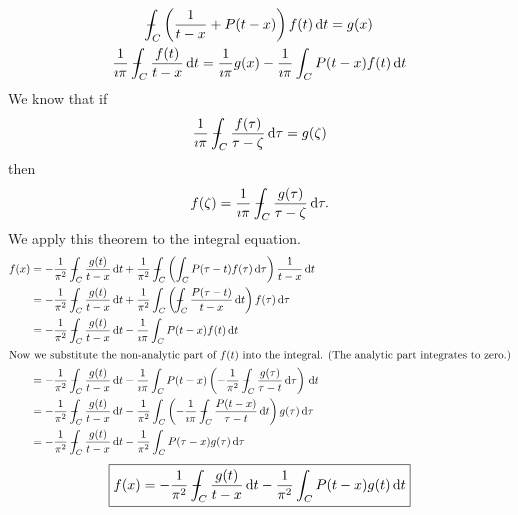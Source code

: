 \begin{Solution}
  \begin{gather*}
    \pv\int_C \left( \frac{1}{t-x} + P(t-x) \right) f(t) \,\dd t = g(x) \\
    \frac{1}{\imath \pi} \pv\int_C \frac{f(t)}{t-x} \,\dd t = \frac{1}{\imath \pi} g(x) 
    - \frac{1}{\imath \pi} \int_C P(t-x) f(t) \,\dd t 
  \end{gather*}
  We know that if 
  \[
  \frac{1}{\imath \pi} - \negthickspace \negthickspace \negthickspace \negmedspace\int_C \frac{f(\tau)}{\tau-\zeta} \,\mathrm{d} \tau = g(\zeta)
  \]
  then
  \[
  f(\zeta) = \frac{1}{\imath \pi} - \negthickspace \negthickspace \negthickspace \negmedspace\int_C \frac{g(\tau)}{\tau-\zeta} \,\mathrm{d} \tau.
  \]
  We apply this theorem to the integral equation.
  \begin{align*}
    f(x)
    &= - \frac{1}{\pi^2} \pv\int_C \frac{g(t)}{t-x} \,\dd t
    + \frac{1}{\pi^2} \pv\int_C \left( \int_C P(\tau-t) f(\tau) \,\dd \tau
    \right) \frac{1}{t-x} \,\dd t \\
    &= - \frac{1}{\pi^2} \pv\int_C \frac{g(t)}{t-x} \,\dd t
    + \frac{1}{\pi^2} \int_C \left( \pv\int_C \frac{P(\tau-t)}{t-x}\,\dd t
    \right) f(\tau) \,\dd \tau \\
    &= - \frac{1}{\pi^2} \pv\int_C \frac{g(t)}{t-x} \,\dd t
    - \frac{1}{\imath \pi} \int_C P(t-x) f(t) \,\dd t \\
    \intertext{Now we substitute the non-analytic part of $f(t)$ into the 
      integral.  (The analytic part integrates to zero.)}
    &= - \frac{1}{\pi^2} \pv\int_C \frac{g(t)}{t-x} \,\dd t
    - \frac{1}{\imath \pi} \int_C P(t-x) \left( - \frac{1}{\pi^2}
      \pv\int_C \frac{g(\tau)}{\tau-t} \,\dd \tau \right) \,\dd t \\
    &= - \frac{1}{\pi^2} \pv\int_C \frac{g(t)}{t-x} \,\dd t
    - \frac{1}{\pi^2} \int_C \left( - \frac{1}{\imath \pi}
      \pv\int_C \frac{P(t-x)}{\tau-t} \,\dd t \right) g(\tau) \,\dd \tau \\
    &= - \frac{1}{\pi^2} \pv\int_C \frac{g(t)}{t-x} \,\dd t
    - \frac{1}{\pi^2} \int_C P(\tau-x) g(\tau) \,\dd \tau 
  \end{align*}
  \[
  \boxed{
    f(x) = - \frac{1}{\pi^2} - \negthickspace \negthickspace \negthickspace \negmedspace\int_C \frac{g(t)}{t-x} \,\mathrm{d} t
    - \frac{1}{\pi^2} \int_C P(t-x) g(t) \,\mathrm{d} t 
    }
  \]
\end{Solution}



\begin{Solution}
\end{Solution}



\begin{Solution}
\end{Solution}








\raggedbottom





